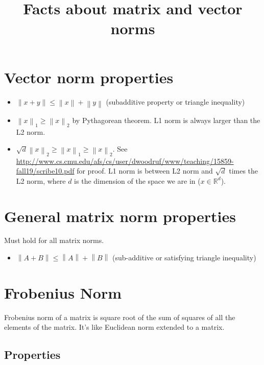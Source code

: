 \documentclass[11pt]{article}
\title{Facts about matrix and vector norms}
\newcommand{\norm}[1]{\left\lVert#1\right\rVert}
\newcommand{\R}{\mathbb{R}}
\begin{document}
\maketitle

\section{Vector norm properties}

\begin{itemize}
\item $\norm{x + y} \leq \norm{x} + \norm{y}$ (subadditive property or triangle inequality)

\item $\norm{x}_1 \geq \norm{x}_2$ by Pythagorean theorem. L1 norm is always larger than the L2 norm.

\item $\sqrt{d}\norm{x}_2 \geq \norm{x}_1 \geq \norm{x}_2$. See \url{http://www.cs.cmu.edu/afs/cs/user/dwoodruf/www/teaching/15859-fall19/scribe10.pdf} for proof. L1 norm is between L2 norm and $\sqrt{d}$ times the L2 norm, where $d$ is the dimension of the space we are in ($x \in \R^d$).
\end{itemize}

\section{General matrix norm properties}

Must hold for all matrix norms.

\begin{itemize}
\item $\norm{A + B} \leq \norm{A} + \norm{B}$ (sub-additive or satisfying triangle inequality)
\end{itemize}

\section{Frobenius Norm}

Frobenius norm of a matrix is square root of the sum of squares of all the elements of the matrix. It's like Euclidean norm extended to a matrix.

\subsection{Properties}
\end{document}
